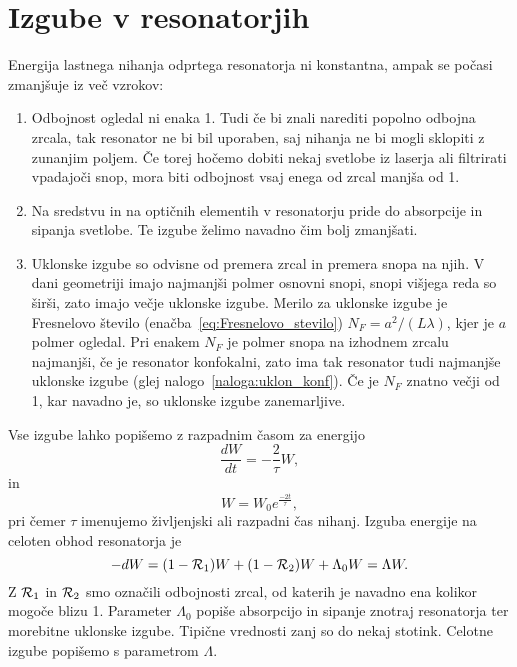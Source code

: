 \section{Izgube v resonatorjih}
Energija lastnega nihanja odprtega resonatorja ni konstantna, ampak se počasi
zmanjšuje iz več vzrokov:
\begin{enumerate}
\item Odbojnost ogledal ni enaka 1. Tudi če bi znali narediti popolno odbojna zrcala, 
tak resonator ne bi bil uporaben, saj nihanja ne bi mogli sklopiti z zunanjim poljem. Če 
torej hočemo dobiti nekaj svetlobe iz laserja ali filtrirati vpadajoči
snop, mora biti odbojnost vsaj enega od zrcal manjša od 1.\\
\item Na sredstvu in na optičnih elementih v resonatorju pride do absorpcije in
sipanja svetlobe. Te izgube želimo navadno čim bolj zmanjšati.\\
\item Uklonske izgube so odvisne od premera zrcal in premera snopa na njih.
V dani geometriji imajo najmanjši polmer osnovni snopi, snopi višjega
reda so širši, zato imajo večje uklonske izgube. Merilo za uklonske
izgube je Fresnelovo število (enačba~\ref{eq:Fresnelovo_stevilo}) 
$N_{F}=a^{2}/(L\lambda)$, kjer je $a$ polmer ogledal. Pri enakem $N_{F}$ je
polmer snopa na izhodnem zrcalu najmanjši, če je resonator konfokalni, 
zato ima tak resonator tudi najmanjše uklonske izgube (glej nalogo~\ref{naloga:uklon_konf}).
Če je $N_{F}$ znatno večji od 1, kar navadno je, so uklonske izgube zanemarljive. \\
\end{enumerate}

Vse izgube lahko popišemo z razpadnim časom za energijo 
\begin{equation}
\frac{dW}{dt}=-\frac{2}{\tau}W,
\label{eq:dW}
\end{equation}
in 
\begin{equation}
W = W_0 e^{\frac{-2t}{\tau}},
\label{eq:dW1}
\end{equation}
pri čemer $\tau$ imenujemo življenjski ali razpadni čas nihanj.
Izguba energije na celoten obhod resonatorja je
\begin{equation}
-dW = (1-{\cal R}_{1})W+(1-{\cal R}_{2})W +\Lambda_{0} W = \Lambda W.
\label{eq:Lambda}
\end{equation}
Z ${\cal R}_{1}$ in ${\cal R}_{2}$ smo označili odbojnosti zrcal, od katerih je navadno ena
kolikor mogoče blizu 1. Parameter $\Lambda_{0}$ popiše absorpcijo in
sipanje znotraj resonatorja ter morebitne uklonske izgube. Tipične vrednosti 
zanj so do nekaj stotink. Celotne izgube popišemo s parametrom $\Lambda$. 

